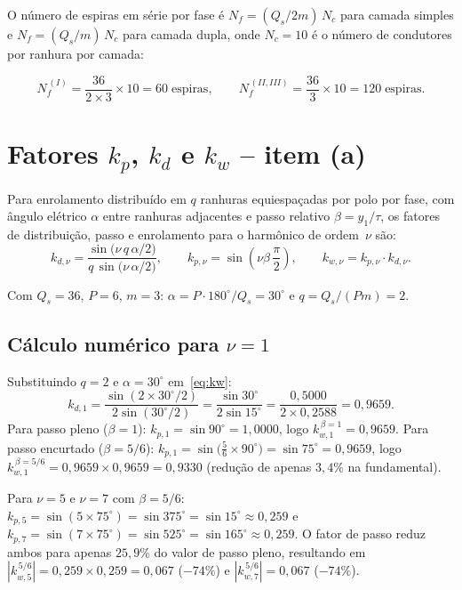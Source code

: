 \documentclass[12pt,a4paper]{article}
\begin{document}
O número de espiras em série por fase é $N_f{=}(Q_s/2m)\,N_c$
para camada simples e $N_f{=}(Q_s/m)\,N_c$ para camada dupla,
onde $N_c{=}10$ é o número de condutores por ranhura por camada:

\begin{equation}
N_f^{\,(I)} = \frac{36}{2\times3}\times10 = 60\;\text{espiras},
\qquad
N_f^{\,(II,III)} = \frac{36}{3}\times10 = 120\;\text{espiras}.
\label{eq:Nf}
\end{equation}

\section{Fatores $k_p$, $k_d$ e $k_w$ -- item (a)}

Para enrolamento distribuído em $q$ ranhuras equiespaçadas por polo por fase,
com ângulo elétrico $\alpha$ entre ranhuras adjacentes e passo relativo
$\beta{=}y_1/\tau$, os fatores de distribuição, passo e enrolamento para o
harmônico de ordem~$\nu$ são:
%
\begin{equation}
k_{d,\nu}=\frac{\sin\!\bigl(\nu\,q\,\alpha/2\bigr)}{q\,\sin\!\bigl(\nu\,\alpha/2\bigr)},
\qquad
k_{p,\nu}=\sin\!\left(\nu\beta\,\frac{\pi}{2}\right),
\qquad
k_{w,\nu}=k_{p,\nu}\cdot k_{d,\nu}.
\label{eq:kw}
\end{equation}

Com $Q_s{=}36$, $P{=}6$, $m{=}3$: $\alpha{=}P\cdot180^{\circ}/Q_s{=}30^{\circ}$
e $q{=}Q_s/(Pm){=}2$.

\subsection*{Cálculo numérico para $\nu=1$}

Substituindo $q{=}2$ e $\alpha{=}30^{\circ}$ em~\eqref{eq:kw}:
\[
k_{d,1}=\frac{\sin(2\times30^{\circ}/2)}{2\sin(30^{\circ}/2)}
        =\frac{\sin 30^{\circ}}{2\sin 15^{\circ}}
        =\frac{0{,}5000}{2\times0{,}2588}
        =0{,}9659.
\]
Para passo pleno ($\beta{=}1$): $k_{p,1}=\sin 90^{\circ}=1{,}0000$,
logo $k_{w,1}^{\,\beta=1}=0{,}9659$.
Para passo encurtado ($\beta{=}5/6$):
$k_{p,1}=\sin\!\bigl(\tfrac{5}{6}{\times}90^{\circ}\bigr)=\sin 75^{\circ}=0{,}9659$,
logo $k_{w,1}^{\,\beta=5/6}=0{,}9659\times0{,}9659=0{,}9330$
(redução de apenas $3{,}4\%$ na fundamental).

Para $\nu{=}5$ e $\nu{=}7$ com $\beta{=}5/6$:
$k_{p,5}=\sin(5{\times}75^{\circ})=\sin 375^{\circ}=\sin 15^{\circ}\approx0{,}259$
e $k_{p,7}=\sin(7{\times}75^{\circ})=\sin 525^{\circ}=\sin 165^{\circ}\approx0{,}259$.
O fator de passo reduz ambos para apenas $25{,}9\%$ do valor de passo pleno,
resultando em $|k_{w,5}^{\,5/6}|{=}0{,}259\times0{,}259{=}0{,}067$
($-74\%$) e $|k_{w,7}^{\,5/6}|{=}0{,}067$ ($-74\%$).
\end{document}

